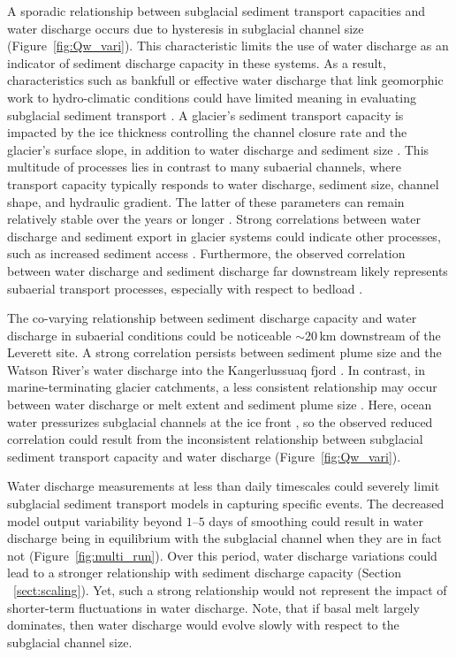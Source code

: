 \documentclass[esurf, manuscript]{copernicus}
\begin{document}
A sporadic relationship between subglacial sediment transport capacities and water discharge occurs due to hysteresis in subglacial channel size (Figure~\ref{fig:Qw_vari}).
This characteristic limits the use of water discharge as an indicator of sediment discharge capacity in these systems.
As a result, characteristics such as bankfull or effective water discharge that link geomorphic work to hydro-climatic conditions could have limited meaning in evaluating subglacial sediment transport \citep{wolman1960,lenzi2006}.
A glacier's sediment transport capacity is impacted by the ice thickness controlling the channel closure rate and the glacier's surface slope, in addition to water discharge and sediment size \citep[Figure~\ref{fig:multi_run}, Section~\ref{sect:sub_mode}; ][]{rothlisberger1972,gimbert2016,stevens2022,walder1994}.
This multitude of processes lies in contrast to many subaerial channels, where transport capacity typically responds to water discharge, sediment size, channel shape,  and hydraulic gradient.
The latter of these parameters can remain relatively stable over the years or longer \citep[Section~\ref{sect:fluv}; e.g.][]{tucker1997}.
Strong correlations between water discharge and sediment export in glacier systems could indicate other processes, such as increased sediment access \citep{zhang2022}.
Furthermore, the observed correlation between water discharge and sediment discharge far downstream likely represents subaerial transport processes, especially with respect to bedload \citep{mancini2023}.

The co-varying relationship between sediment discharge capacity and water discharge in subaerial conditions could be noticeable $\sim20$\,\unit{km} downstream of the Leverett site.
A strong correlation persists between sediment plume size and the Watson River's water discharge into the Kangerlussuaq fjord \citep{chu2009,mcgrath2010}.
In contrast, in marine-terminating glacier catchments, a less consistent relationship may occur between water discharge or melt extent and sediment plume size \citep{chu2012,tedstone2012}.
Here, ocean water pressurizes subglacial channels at the ice front \citep[e.g.][]{how2017}, so the observed reduced correlation could result from the inconsistent relationship between subglacial sediment transport capacity and water discharge (Figure~\ref{fig:Qw_vari}).

Water discharge measurements at less than daily timescales could severely limit subglacial sediment transport models in capturing specific events.
The decreased model output variability beyond $1$--$5$ days of smoothing could result in water discharge being in equilibrium with the subglacial channel when they are in fact not (Figure~\ref{fig:multi_run}).
Over this period, water discharge variations could lead to a stronger relationship with sediment discharge capacity (Section ~\ref{sect:scaling}).
Yet, such a strong relationship would not represent the impact of shorter-term fluctuations in water discharge.
Note, that if basal melt largely dominates, then water discharge would evolve slowly with respect to the subglacial channel size.
\end{document}
